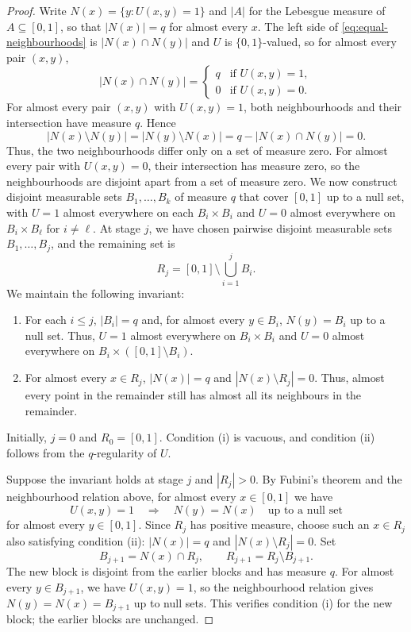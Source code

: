 \documentclass[11pt]{article}
\theoremstyle{remark}
\numberwithin{equation}{section}
\begin{document}
\begin{proof}
  Write $N(x)=\{y:U(x,y)=1\}$ and $|A|$ for the Lebesgue measure of $A\subseteq[0,1]$, so that $|N(x)|=q$ for almost every $x$.
  The left side of \eqref{eq:equal-neighbourhoods} is $|N(x)\cap N(y)|$ and $U$ is $\{0,1\}$-valued, so for almost every pair $(x,y)$,
  \[
    \bigl|N(x)\cap N(y)\bigr|
    =\begin{cases}
      q&\text{if }U(x,y)=1,\\
      0&\text{if }U(x,y)=0.
    \end{cases}
  \]
  For almost every pair $(x,y)$ with $U(x,y)=1$, both neighbourhoods
  and their intersection have measure $q$. Hence
  \[
    |N(x)\setminus N(y)|=|N(y)\setminus N(x)|
    =q-|N(x)\cap N(y)|=0.
  \]
  Thus, the two neighbourhoods differ only on a set of measure zero.
  For almost every pair with $U(x,y)=0$, their intersection has measure
  zero, so the neighbourhoods are disjoint apart from a set of measure zero.
  We now construct disjoint measurable sets $B_1,\ldots,B_k$ of measure
  $q$ that cover $[0,1]$ up to a null set, with $U=1$ almost everywhere
  on each $B_i\times B_i$ and $U=0$ almost everywhere on $B_i\times B_\ell$
  for $i\ne\ell$. At stage $j$, we have chosen pairwise disjoint measurable sets
  $B_1,\ldots,B_j$, and the remaining set is
  \[
    R_j=[0,1]\setminus\bigcup_{i=1}^j B_i.
  \]
  We maintain the following invariant:
  \begin{enumerate}[label=(\roman*)]
    \item For each $i\le j$, $|B_i|=q$ and, for almost every $y\in B_i$,
      $N(y)=B_i$ up to a null set. Thus, $U=1$ almost everywhere on
      $B_i\times B_i$ and $U=0$ almost everywhere on
      $B_i\times([0,1]\setminus B_i)$.
    \item For almost every $x\in R_j$, $|N(x)|=q$ and
      $|N(x)\setminus R_j|=0$. Thus, almost every point in the
      remainder still has almost all its neighbours in the remainder.
  \end{enumerate}
  Initially, $j=0$ and $R_0=[0,1]$. Condition (i) is vacuous, and
  condition (ii) follows from the $q$-regularity of $U$.

  Suppose the invariant holds at stage $j$ and $|R_j|>0$.
  By Fubini's theorem and the neighbourhood relation above, for almost
  every $x\in[0,1]$ we have
  \[
    U(x,y)=1\quad\Longrightarrow\quad N(y)=N(x)
    \quad\text{up to a null set}
  \]
  for almost every $y\in[0,1]$.
  Since $R_j$ has positive measure, choose such an $x\in R_j$ also
  satisfying condition (ii): $|N(x)|=q$ and
  $|N(x)\setminus R_j|=0$. Set
  \[
    B_{j+1}=N(x)\cap R_j,
    \qquad R_{j+1}=R_j\setminus B_{j+1}.
  \]
  The new block is disjoint from the earlier blocks and has measure
  $q$. For almost every $y\in B_{j+1}$, we have
  $U(x,y)=1$, so the neighbourhood relation gives
  $N(y)=N(x)=B_{j+1}$ up to null sets. This verifies condition (i) for the new block;
  the earlier blocks are unchanged.


\end{proof}
\end{document}
